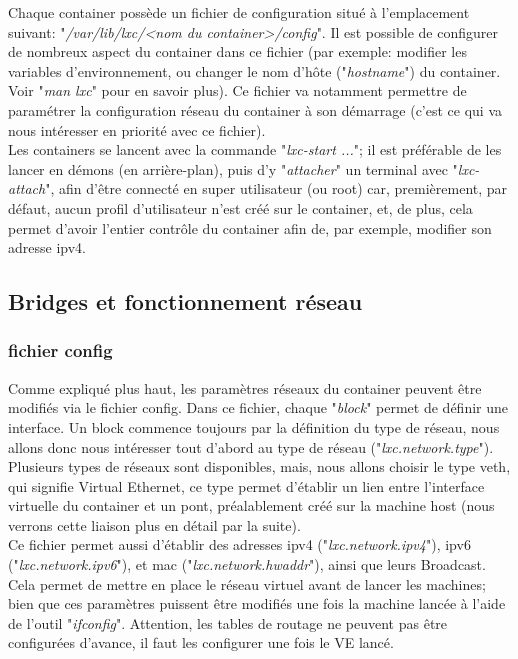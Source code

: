 Chaque container poss\`ede un fichier de configuration situ\'e \`a l'emplacement suivant: "\emph{/var/lib/lxc/<nom du container>/config}".
Il est possible de configurer de nombreux aspect du container dans ce fichier (par exemple: modifier
les variables d'environnement, ou changer le nom d'h\^ote ("\emph{hostname}") du container. Voir "\emph{man lxc}"
pour en savoir plus). Ce fichier va notamment permettre de param\'etrer la configuration r\'eseau du container
\`a son d\'emarrage (c'est ce qui va nous int\'eresser en priorit\'e avec ce fichier).\\

Les containers se lancent avec la commande "\emph{lxc-start ...}"; il est pr\'ef\'erable de les lancer en d\'emons
(en arri\`ere-plan), puis d'y "\emph{attacher}" un terminal avec "\emph{lxc-attach}", afin d'\^etre connect\'e en super
utilisateur (ou root) car, premi\`erement, par d\'efaut, aucun profil d'utilisateur n'est cr\'e\'e sur le container,
et, de plus, cela permet d'avoir l'entier contr\^ole du container afin de, par exemple, modifier son adresse ipv4.\\


\subsection{Bridges et fonctionnement r\'eseau}
\subsubsection{fichier config}
Comme expliqu\'e plus haut, les param\`etres r\'eseaux du container peuvent \^etre modifi\'es via le fichier config.
Dans ce fichier, chaque "\emph{block}" permet de d\'efinir une interface. Un block commence toujours par la 
d\'efinition du type de r\'eseau, nous allons donc nous int\'eresser tout d'abord au type de r\'eseau ("\emph{lxc.network.type}").
Plusieurs types de r\'eseaux sont disponibles, mais, nous allons choisir le type veth, qui signifie Virtual 
Ethernet, ce type permet d'\'etablir un lien entre l'interface virtuelle du container et un pont, pr\'ealablement
cr\'e\'e sur la machine host (nous verrons cette liaison plus en d\'etail par la suite).\\

Ce fichier permet aussi d'\'etablir des adresses ipv4 ("\emph{lxc.network.ipv4}"), ipv6 ("\emph{lxc.network.ipv6}"),
et mac ("\emph{lxc.network.hwaddr}"), ainsi que leurs Broadcast. Cela permet de mettre en place le r\'eseau 
virtuel avant de lancer les machines; bien que ces param\`etres puissent \^etre modifi\'es une fois la machine
lanc\'ee \`a l'aide de l'outil "\emph{ifconfig}". Attention, les tables de routage ne peuvent pas \^etre configur\'ees d'avance, il faut les configurer une fois le VE lanc\'e.\\

